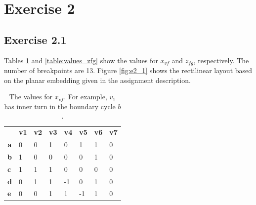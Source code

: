 \documentclass[12pt]{article}
\begin{document}
\section*{Exercise 2}
\subsection*{Exercise 2.1}

  Tables \ref{table:values_xvf} and \ref{table:values_zfg} show the values for $x_{vf}$ and $z_{fg}$, respectively. The number of breakpoints are 13. Figure \ref{fig:e2_1} shows the rectilinear layout based on the planar embedding given in the assignment description.

  \begin{table}[h]
    \centering
    \begin{tabular}{llllllll}
                                    & \textbf{v1} & \textbf{v2} & \textbf{v3} & \textbf{v4} & \textbf{v5} & \textbf{v6} & \textbf{v7} \\ \cline{2-8}
    \multicolumn{1}{c|}{\textbf{a}} & 0           & 0           & 1           & 0           & 1           & 1           & 0           \\
    \multicolumn{1}{l|}{\textbf{b}} & 1           & 0           & 0           & 0           & 0           & 1           & 0           \\
    \multicolumn{1}{l|}{\textbf{c}} & 1           & 1           & 1           & 0           & 0           & 0           & 0           \\
    \multicolumn{1}{l|}{\textbf{d}} & 0           & 1           & 1           & -1          & 0           & 1           & 0           \\
    \multicolumn{1}{l|}{\textbf{e}} & 0           & 0           & 1           & 1           & -1          & 1           & 0
    \end{tabular}
    \caption{The values for $x_{vf}$. For example, $v_1$ has inner turn in the boundary cycle $b$.}
    \label{table:values_xvf}
  \end{table}
\end{document}
